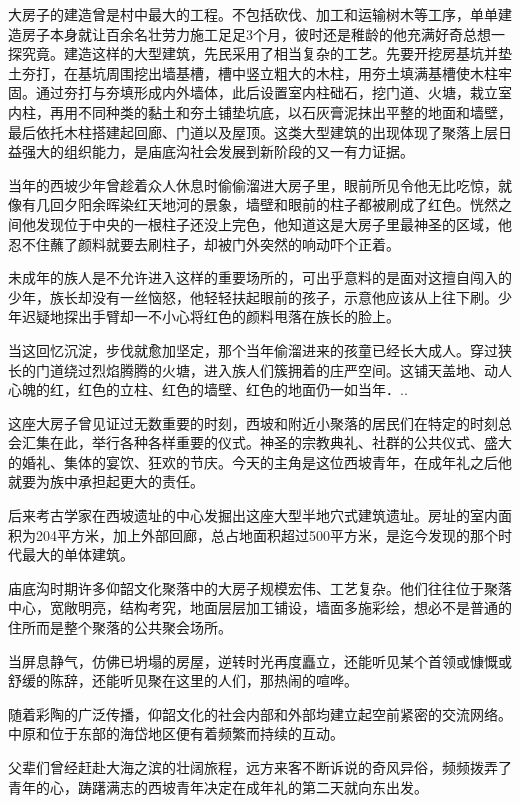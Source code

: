 大房子的建造曾是村中最大的工程。不包括砍伐、加工和运输树木等工序，单单建造房子本身就让百余名壮劳力施工足足3个月，彼时还是稚龄的他充满好奇总想一探究竟。建造这样的大型建筑，先民采用了相当复杂的工艺。先要开挖房基坑并垫土夯打，在基坑周围挖出墙基槽，槽中竖立粗大的木柱，用夯土填满基槽使木柱牢固。通过夯打与夯填形成内外墙体，此后设置室内柱础石，挖门道、火塘，栽立室内柱，再用不同种类的黏土和夯土铺垫坑底，以石灰膏泥抹出平整的地面和墙壁，最后依托木柱搭建起回廊、门道以及屋顶。这类大型建筑的出现体现了聚落上层日益强大的组织能力，是庙底沟社会发展到新阶段的又一有力证据。

当年的西坡少年曾趁着众人休息时偷偷溜进大房子里，眼前所见令他无比吃惊，就像有几回夕阳余晖染红天地河的景象，墙壁和眼前的柱子都被刷成了红色。恍然之间他发现位于中央的一根柱子还没上完色，他知道这是大房子里最神圣的区域，他忍不住蘸了颜料就要去刷柱子，却被门外突然的响动吓个正着。

未成年的族人是不允许进入这样的重要场所的，可出乎意料的是面对这擅自闯入的少年，族长却没有一丝恼怒，他轻轻扶起眼前的孩子，示意他应该从上往下刷。少年迟疑地探出手臂却一不小心将红色的颜料甩落在族长的脸上。

当这回忆沉淀，步伐就愈加坚定，那个当年偷溜进来的孩童已经长大成人。穿过狭长的门道绕过烈焰腾腾的火塘，进入族人们簇拥着的庄严空间。这铺天盖地、动人心魄的红，红色的立柱、红色的墙壁、红色的地面仍一如当年．..

这座大房子曾见证过无数重要的时刻，西坡和附近小聚落的居民们在特定的时刻总会汇集在此，举行各种各样重要的仪式。神圣的宗教典礼、社群的公共仪式、盛大的婚礼、集体的宴饮、狂欢的节庆。今天的主角是这位西坡青年，在成年礼之后他就要为族中承担起更大的责任。

后来考古学家在西坡遗址的中心发掘出这座大型半地穴式建筑遗址。房址的室内面积为204平方米，加上外部回廊，总占地面积超过500平方米，是迄今发现的那个时代最大的单体建筑。

庙底沟时期许多仰韶文化聚落中的大房子规模宏伟、工艺复杂。他们往往位于聚落中心，宽敞明亮，结构考究，地面层层加工铺设，墙面多施彩绘，想必不是普通的住所而是整个聚落的公共聚会场所。

当屏息静气，仿佛已坍塌的房屋，逆转时光再度矗立，还能听见某个首领或慷慨或舒缓的陈辞，还能听见聚在这里的人们，那热闹的喧哗。

随着彩陶的广泛传播，仰韶文化的社会内部和外部均建立起空前紧密的交流网络。中原和位于东部的海岱地区便有着频繁而持续的互动。

父辈们曾经赶赴大海之滨的壮阔旅程，远方来客不断诉说的奇风异俗，频频拨弄了青年的心，踌躇满志的西坡青年决定在成年礼的第二天就向东出发。

